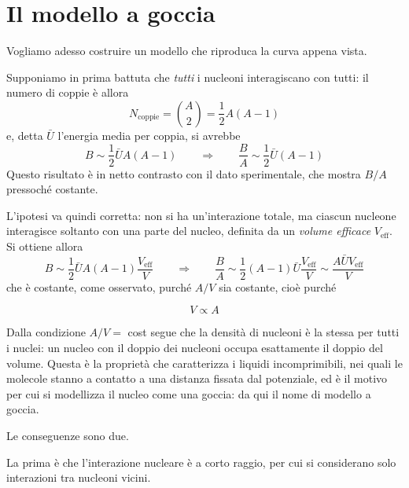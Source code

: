 \section{Il modello a goccia}

Vogliamo adesso costruire un modello che riproduca la curva appena vista. 

Supponiamo in prima battuta che \emph{tutti} i nucleoni interagiscano con tutti: il numero di coppie è allora
%
\begin{equation}
    N_{\text{coppie}} = \binom{A}{2} = \frac{1}{2} A (A-1)
\end{equation}
e, detta $\bar{U}$ l'energia media per coppia, si avrebbe
%
\begin{equation}
    B \sim \frac{1}{2} \bar{U} A (A-1) \qquad \Longrightarrow \qquad \frac{B}{A} \sim \frac{1}{2} \bar{U} (A-1)
\end{equation}
Questo risultato è in netto contrasto con il dato sperimentale, che mostra $B/A$ pressoché costante. 

L'ipotesi va quindi corretta: non si ha un'interazione totale, ma ciascun nucleone interagisce soltanto con una parte del nucleo, definita da un \emph{volume efficace} $V_{\text{eff}}$. Si ottiene allora
%
\begin{equation}
    B \sim \frac{1}{2} \bar{U} A (A-1) \frac{V_{\text{eff}}}{V} \qquad \Longrightarrow \qquad \frac{B}{A} \sim \frac{1}{2} (A-1) \bar{U} \frac{V_{\text{eff}}}{V} \sim \frac{A \bar{U} V_{\text{eff}}}{V}
\end{equation}
che è costante, come osservato, purché $A/V$ sia costante, cioè purché
%
\begin{tcolorbox}[colback=black!5!white, colframe=black!45!white, boxrule=0.8pt]
\begin{equation}
    V \propto A
\end{equation}
\end{tcolorbox}

Dalla condizione $A/V = $ cost segue che la densità di nucleoni è la stessa per tutti i nuclei: un nucleo con il doppio dei nucleoni occupa esattamente il doppio del volume. Questa è la proprietà che caratterizza i liquidi incomprimibili, nei quali le molecole stanno a contatto a una distanza fissata dal potenziale, ed è il motivo per cui si modellizza il nucleo come una goccia: da qui il nome di modello a goccia. 

Le conseguenze sono due. 

La prima è che l'interazione nucleare è a corto raggio, per cui si considerano solo interazioni tra nucleoni vicini. 

